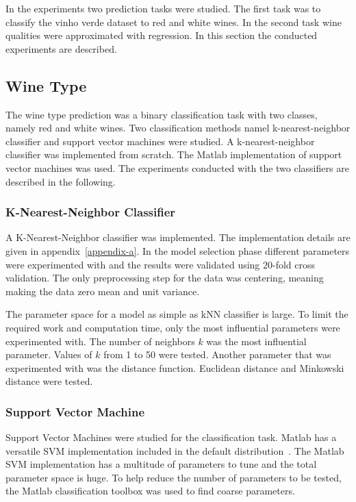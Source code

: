 In the experiments two prediction tasks were studied. The first task was to classify the vinho verde dataset to red and white wines. In the second task wine qualities were approximated with regression. In this section the conducted experiments are described.

\subsection{Wine Type}
The wine type prediction was a binary classification task with two classes, namely red and white wines. Two classification methods namel k-nearest-neighbor classifier and support vector machines were studied. A k-nearest-neighbor classifier was implemented from scratch. The Matlab implementation of support vector machines was used. The experiments conducted with the two classifiers are described in the following.

\subsubsection{K-Nearest-Neighbor Classifier}
A K-Nearest-Neighbor classifier was implemented. The implementation details are given in appendix~\ref{appendix-a}. In the model selection phase different parameters were experimented with and the results were validated using 20-fold cross validation. The only preprocessing step for the data was centering, meaning making the data zero mean and unit variance.

The parameter space for a model as simple as kNN classifier is large. To limit the required work and computation time, only the most influential parameters were experimented with. The number of neighbors $k$ was the most influential parameter. Values of $k$ from 1 to 50 were tested. Another parameter that was experimented with was the distance function. Euclidean distance and Minkowski distance were tested.

\subsubsection{Support Vector Machine}
Support Vector Machines were studied for the classification task. Matlab has a versatile SVM implementation included in the default distribution~\cite{matlab:2015:fitcsvm}. The Matlab SVM implementation has a multitude of parameters to tune and the total parameter space is huge. To help reduce the number of parameters to be tested, the Matlab classification toolbox was used to find coarse parameters.

